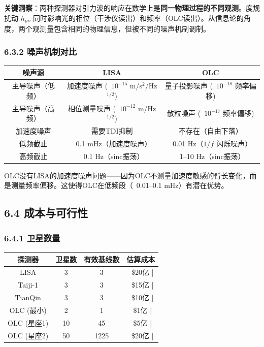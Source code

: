 \documentclass[12pt,a4paper]{article}
\begin{document}
\textbf{关键洞察}：两种探测器对引力波的响应在数学上是\textbf{同一物理过程的不同观测}。度规扰动 $h_{\mu\nu}$ 同时影响光的相位（干涉仪读出）和频率（OLC读出）。从信息论的角度，两个观测量包含相同的物理信息，但被不同的噪声机制调制。

\subsubsection{6.3.2 噪声机制对比}


\begin{tabular}{|c|c|c|}
\hline
噪声源 & LISA & OLC \\
\hline
主导噪声（低频） & 加速度噪声 (~$10^{-15}$ m/s$^2$/Hz$^{1/2}$) & 量子投影噪声 (~$10^{-18}$ 频率偏移) \\
主导噪声（高频） & 相位测量噪声 (~$10^{-12}$ m/Hz$^{1/2}$) & 散粒噪声 (~$10^{-17}$ 频率偏移) \\
加速度噪声 & 需要TDI抑制 & 不存在（自由下落） \\
低频截止 & ~0.1 mHz（加速度噪声） & ~0.01 Hz（$1/f$ 闪烁噪声） \\
高频截止 & ~0.1 Hz（sinc振荡） & ~1–10 Hz（sinc振荡） \\
\hline
\end{tabular}


OLC没有LISA的加速度噪声问题——因为OLC不测量加速度敏感的臂长变化，而是测量频率偏移。这使得OLC在低频段（~0.01–0.1 mHz）有潜在优势。

\subsection{6.4 成本与可行性}


\subsubsection{6.4.1 卫星数量}


\begin{tabular}{|c|c|c|c|}
\hline
探测器 & 卫星数 & 有效基线数 & 估算成本 \\
\hline
LISA & 3 & 3 & ~\$20亿 | \\
Taiji-1 & 3 & 3 & ~\$15亿 | \\
TianQin & 3 & 3 & ~\$10亿 | \\
OLC (最小) & 2 & 1 & ~\$1亿 | \\
OLC (星座1) & 10 & 45 & ~\$5亿 | \\
OLC (星座2) & 50 & 1225 & ~\$20亿 | \\
\hline
\end{tabular}
\end{document}
